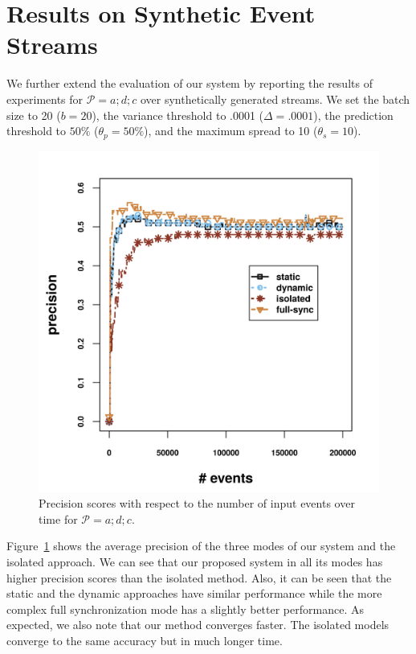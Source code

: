 \section{Results on Synthetic Event Streams}
\label{sec:results_synthetic}
\FloatBarrier
We further extend the evaluation of our system by reporting the results of experiments for $\mathcal{P}=a ; d ; c$ over synthetically generated streams. We set the batch size to 20 ($b=20$), the variance threshold to .0001 ($\Delta=.0001$), the  \pmcmr prediction threshold to $50\%$ ($\theta_{p}=50\%$), and the maximum spread to 10 ($\theta_{s}=10$).
%


\begin{figure}[H]
	\centering
	\includegraphics[width=\textwidth,height=.9\textwidth,keepaspectratio]{chapters/figures/synthetic/new/precision_synthetic.png}
	
	\caption{Precision scores with respect to the number of input events over time for $\mathcal{P}=a;d;c$.}
	\label{fig:precsion_synthetic}
\end{figure}

\par Figure~\ref{fig:precsion_synthetic} shows the average precision of the three modes of our system and the isolated approach. We can see that our proposed system in all its modes has higher precision scores than the isolated method. Also, it can be seen that the static and the dynamic approaches have similar performance while the more complex full synchronization mode has a slightly better performance. As expected, we also note that our method converges faster. The isolated models converge to the same accuracy but in much longer time.


